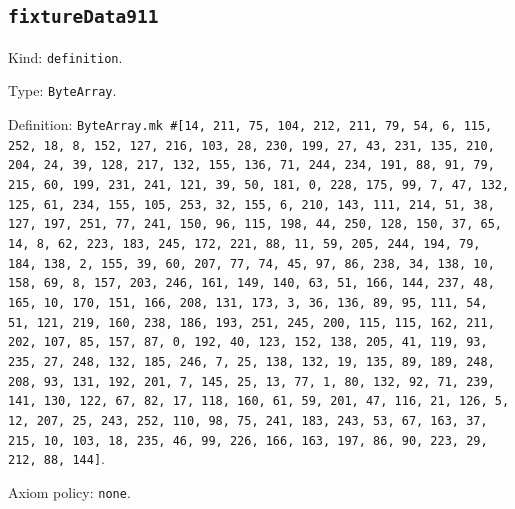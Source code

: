 \documentclass[11pt]{article}
\begin{document}
\subsection*{\texttt{fixtureData911}}
\noindent Kind: \texttt{definition}.\par
\noindent Type: \texttt{ByteArray}.\par
\noindent Definition: \texttt{ByteArray.mk \#[14, 211, 75, 104, 212, 211, 79, 54, 6, 115, 252, 18, 8, 152, 127, 216, 103, 28, 230, 199, 27, 43, 231, 135, 210, 204, 24, 39, 128, 217, 132, 155, 136, 71, 244, 234, 191, 88, 91, 79, 215, 60, 199, 231, 241, 121, 39, 50, 181, 0, 228, 175, 99, 7, 47, 132, 125, 61, 234, 155, 105, 253, 32, 155, 6, 210, 143, 111, 214, 51, 38, 127, 197, 251, 77, 241, 150, 96, 115, 198, 44, 250, 128, 150, 37, 65, 14, 8, 62, 223, 183, 245, 172, 221, 88, 11, 59, 205, 244, 194, 79, 184, 138, 2, 155, 39, 60, 207, 77, 74, 45, 97, 86, 238, 34, 138, 10, 158, 69, 8, 157, 203, 246, 161, 149, 140, 63, 51, 166, 144, 237, 48, 165, 10, 170, 151, 166, 208, 131, 173, 3, 36, 136, 89, 95, 111, 54, 51, 121, 219, 160, 238, 186, 193, 251, 245, 200, 115, 115, 162, 211, 202, 107, 85, 157, 87, 0, 192, 40, 123, 152, 138, 205, 41, 119, 93, 235, 27, 248, 132, 185, 246, 7, 25, 138, 132, 19, 135, 89, 189, 248, 208, 93, 131, 192, 201, 7, 145, 25, 13, 77, 1, 80, 132, 92, 71, 239, 141, 130, 122, 67, 82, 17, 118, 160, 61, 59, 201, 47, 116, 21, 126, 5, 12, 207, 25, 243, 252, 110, 98, 75, 241, 183, 243, 53, 67, 163, 37, 215, 10, 103, 18, 235, 46, 99, 226, 166, 163, 197, 86, 90, 223, 29, 212, 88, 144]}.\par
\noindent Axiom policy: \texttt{none}.\par
\end{document}
